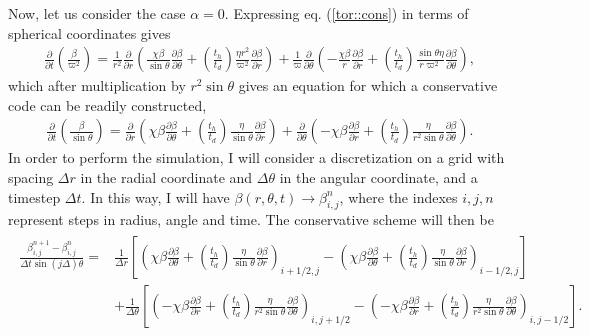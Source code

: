 \documentclass[letterpaper,10pt]{article}
\newcommand{\pp}{\partial}
\newcommand{\D}{\displaystyle}
\begin{document}
Now, let us consider the case $\alpha=0$. Expressing eq. (\ref{tor::cons}) in terms of spherical coordinates gives
\begin{eqnarray}
\frac{\pp}{\pp t}\left(\frac{\beta}{\varpi^2}\right)=\frac{1}{r^2} \frac{\pp}{\pp r}\left(\frac{\chi\beta}{\sin\theta}\frac{\pp \beta}{\pp\theta}+\left(\frac{t_h}{t_d}\right)\frac{\eta r^2}{\varpi^2}\frac{\pp\beta}{\pp r}\right)+\frac{1}{\varpi}\frac{\pp}{\pp\theta}\left(-\frac{\chi\beta}{r}\frac{\pp\beta}{\pp r}+\left(\frac{t_h}{t_d}\right)\frac{\sin\theta \eta}{r\varpi^2}\frac{\pp\beta}{\pp\theta}\right),
\end{eqnarray}
which after multiplication by $r^2\sin\theta$ gives an equation for which a conservative code can be readily constructed,
\begin{eqnarray}
\frac{\pp}{\pp t}\left(\frac{\beta}{\sin\theta}\right)=\frac{\pp}{\pp r}\left(\chi\beta\frac{\pp \beta}{\pp\theta}+\left(\frac{t_h}{t_d}\right)\frac{\eta}{\sin\theta}\frac{\pp\beta}{\pp r}\right)+\frac{\pp}{\pp\theta}\left(-\chi\beta\frac{\pp\beta}{\pp r}+\left(\frac{t_h}{t_d}\right)\frac{\eta}{r^2\sin\theta}\frac{\pp\beta}{\pp\theta}\right).\label{equbeta}
\end{eqnarray}
In order to perform the simulation, I will consider a discretization on a grid with spacing $\Delta r$ in the radial coordinate and $\Delta \theta$ in the angular coordinate, and a timestep $\Delta t$. In this way, I will have $\beta(r,\theta,t)\rightarrow \beta_{i,j}^n$, where the indexes $i,j,n$ represent steps in radius, angle and time. The conservative scheme will then be
\begin{eqnarray}
\begin{aligned}
\frac{\beta_{i,j}^{n+1}-\beta_{i,j}^{n}}{\Delta t\sin (j\Delta)\theta}=&\D\frac{1}{\Delta r}\left[\left(\chi\beta\frac{\pp \beta}{\pp\theta}+\left(\frac{t_h}{t_d}\right)\frac{\eta}{\sin\theta}\frac{\pp\beta}{\pp r}\right)_{i+1/2,j}-\left(\chi\beta\frac{\pp \beta}{\pp\theta}+\left(\frac{t_h}{t_d}\right)\frac{\eta}{\sin\theta}\frac{\pp\beta}{\pp r}\right)_{i-1/2,j}\right]\\
&\D+\frac{1}{\Delta\theta}\left[\left(-\chi\beta\frac{\pp\beta}{\pp r}+\left(\frac{t_h}{t_d}\right)\frac{\eta}{r^2\sin\theta}\frac{\pp\beta}{\pp\theta}\right)_{i,j+1/2}-\left(-\chi\beta\frac{\pp\beta}{\pp r}+\left(\frac{t_h}{t_d}\right)\frac{\eta}{r^2\sin\theta}\frac{\pp\beta}{\pp\theta}\right)_{i,j-1/2}\right].\label{equbetacons}
\end{aligned}
\end{eqnarray}
\end{document}
